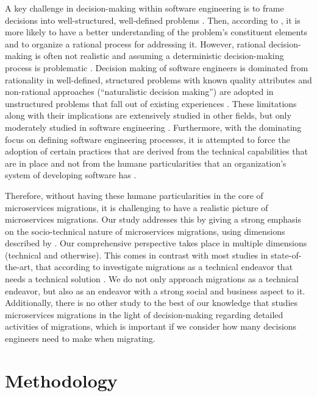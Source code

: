 \documentclass[sigconf,dvipsnames]{acmart}
\begin{document}
A key challenge in decision-making within software engineering is to frame decisions into well-structured, well-defined problems \cite{zannier2007model}. Then, according to \citeauthor{zannier2007model}, it is more likely to have a better understanding of the problem's constituent elements and to organize a rational process for addressing it. 
However, rational decision-making is often not realistic and assuming a deterministic decision-making process is problematic \cite{tang2017human}. 
Decision making of software engineers is dominated from rationality in well-defined, structured problems with known quality attributes and non-rational approaches (``naturalistic decision making'') are adopted in unstructured problems that fall out of existing experiences \cite{zannier2007model}. 
These limitations along with their implications are extensively studied in other fields, but only moderately studied in software engineering \cite{tang2017human}. Furthermore, with the dominating focus on defining software engineering processes, it is attempted to force the adoption of certain practices that are derived from the technical capabilities that are in place \cite{parnas2009document} and not from the humane particularities that an organization’s system of developing software has \cite{tang2017human}. 

Therefore, without having these humane particularities in the core of microservices migrations, it is challenging to have a realistic picture of microservices migrations. 
Our study addresses this by giving a strong emphasis on the socio-technical nature of microservices migrations, using dimensions described by \citeauthor{Baxter2011} \cite{Baxter2011}. Our comprehensive perspective takes place in multiple dimensions (technical and otherwise). This comes in contrast with most studies in state-of-the-art, that according to \citeauthor{Hassan2020} investigate migrations as a technical endeavor that needs a technical solution \cite{Hassan2020}. We do not only approach migrations as a technical endeavor, but also as an endeavor with a strong social and business aspect to it. Additionally, there is no other study to the best of our knowledge that studies microservices migrations in the light of decision-making regarding detailed activities of migrations, which is important if we consider how many decisions engineers need to make when migrating.

\section{Methodology}
\end{document}
